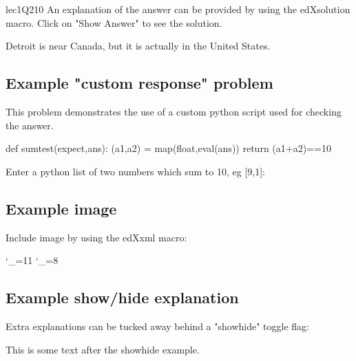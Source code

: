 \begin{edXproblem}{lec1Q2}{10}
An explanation of the answer can be provided by using the edXsolution
macro.  Click on "Show Answer" to see the solution.

\begin{edXsolution}
Detroit is near Canada, but it is actually in the United States.
\end{edXsolution}
        
\subsection{Example "custom response" problem}

This problem demonstrates the use of a custom python script used for
checking the answer.

\begin{edXscript}
def sumtest(expect,ans):
    (a1,a2) = map(float,eval(ans))
    return (a1+a2)==10
\end{edXscript}

Enter a python list of two numbers which sum to 10, eg [9,1]:


\subsection{Example image}

Include image by using the edXxml macro:

\catcode`_=11
\catcode`_=8

\subsection{Example show/hide explanation}

Extra explanations can be tucked away behind a "showhide" toggle flag:


This is some text after the showhide example.

\end{edXproblem}

    
